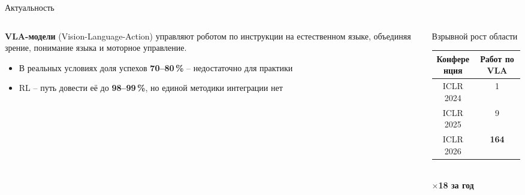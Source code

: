 \documentclass[aspectratio=169,13pt]{beamer}
\begin{document}
\begin{frame}{Актуальность}
  \begin{columns}[T]
    \begin{column}{0.55\textwidth}
      \textbf{VLA-модели} (Vision-Language-Action) управляют роботом по инструкции на естественном языке, объединяя зрение, понимание языка и моторное управление.
      \begin{itemize}\setlength\itemsep{3pt}
        \item В реальных условиях доля успехов \textbf{70--80\,\%} -- недостаточно для практики
        \item RL -- путь довести её до \textbf{98--99\,\%}, но единой методики интеграции нет
      \end{itemize}
    \end{column}
    \begin{column}{0.42\textwidth}
      \begin{block}{Взрывной рост области}
        \centering\small
        \begin{tabular}{cc}
          \toprule
          Конференция & Работ по VLA \\
          \midrule
          ICLR 2024 & 1 \\
          ICLR 2025 & 9 \\
          ICLR 2026 & \textbf{164} \\
          \bottomrule
        \end{tabular}\\[4pt]
        \textbf{\textcolor{itmopurple}{$\times$18 за год}}
      \end{block}
    \end{column}
  \end{columns}
\end{frame}
\end{document}
